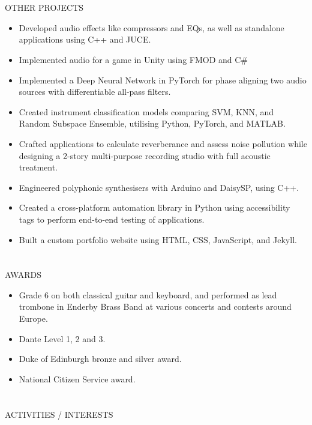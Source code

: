 \documentclass{my_cv}
\begin{document}
\begin{multicols}{2}
\section{\faPaintBrush}{OTHER PROJECTS}
\begin{itemize}[noitemsep]
    \item Developed audio effects like compressors and EQs, as well as standalone applications using C++ and JUCE.
    \item Implemented audio for a game in Unity using FMOD and C\#
    \item Implemented a Deep Neural Network in PyTorch for phase aligning two audio sources with differentiable all-pass filters.
    \item Created instrument classification models comparing SVM, KNN, and Random Subspace Ensemble, utilising Python, PyTorch, and MATLAB.
    \item Crafted applications to calculate reverberance and assess noise pollution while designing a 2-story multi-purpose recording studio with full acoustic treatment.
    \item Engineered polyphonic synthesisers with Arduino and DaisySP, using C++.
    \item Created a cross-platform automation library in Python using accessibility tags to perform end-to-end testing of applications.
    \item Built a custom portfolio website using HTML, CSS, JavaScript, and Jekyll.
\end{itemize}

\section{\faStar}{AWARDS}

\begin{itemize}[noitemsep]
    \item Grade 6 on both classical guitar and keyboard, and performed as lead trombone in Enderby Brass Band at various concerts and contests around Europe.
    \item Dante Level 1, 2 and 3.
    \item Duke of Edinburgh bronze and silver award.
    \item National Citizen Service award.
\end{itemize}

\section{\faSoccerBallO}{ACTIVITIES / INTERESTS}


\end{multicols}
\end{document}
